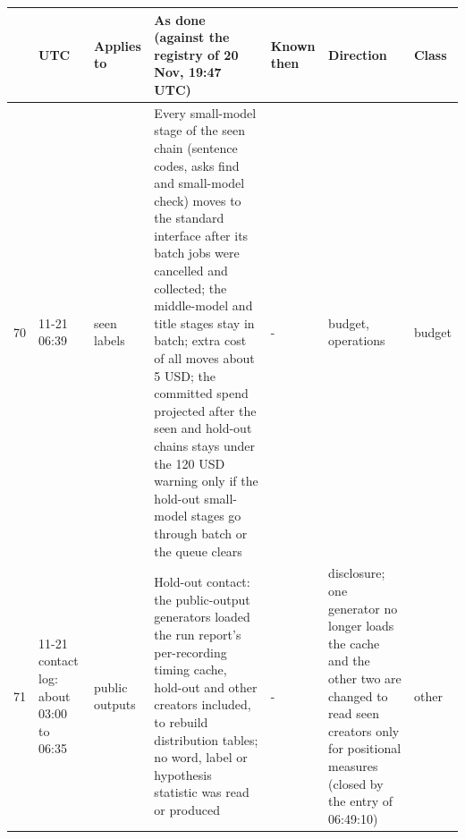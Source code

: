 {\tiny\setlength{\tabcolsep}{2pt}
\begin{tabular}{@{}rp{}p{}p{}p{}p{}l@{}}
\toprule
 & UTC & Applies to & As done (against the registry of 20 Nov, 19:47 UTC) & Known then & Direction & Class \\
\midrule
70 & 11-21 06:39 & seen labels & Every small-model stage of the seen chain (sentence codes, asks find and small-model check) moves to the standard interface after its batch jobs were cancelled and collected; the middle-model and title stages stay in batch; extra cost of all moves about 5 USD; the committed spend projected after the seen and hold-out chains stays under the 120 USD warning only if the hold-out small-model stages go through batch or the queue clears & - & budget, operations & budget \\
71 & 11-21 contact log: about 03:00 to 06:35 & public outputs & Hold-out contact: the public-output generators loaded the run report's per-recording timing cache, hold-out and other creators included, to rebuild distribution tables; no word, label or hypothesis statistic was read or produced & - & disclosure; one generator no longer loads the cache and the other two are changed to read seen creators only for positional measures (closed by the entry of 06:49:10) & other \\

\end{tabular}}
